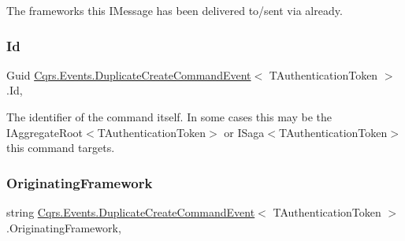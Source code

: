 The frameworks this I\+Message has been delivered to/sent via already. 

\mbox{\label{classCqrs_1_1Events_1_1DuplicateCreateCommandEvent_a6b837c04369ac127fc34f84799c3d70a_a6b837c04369ac127fc34f84799c3d70a}} 
\subsubsection{\texorpdfstring{Id}{Id}}
{\footnotesize\ttfamily Guid \hyperlink{classCqrs_1_1Events_1_1DuplicateCreateCommandEvent}{Cqrs.\+Events.\+Duplicate\+Create\+Command\+Event}$<$ T\+Authentication\+Token $>$.Id\hspace{0.3cm}{\ttfamily [get]}, {\ttfamily [set]}}



The identifier of the command itself. In some cases this may be the I\+Aggregate\+Root$<$\+T\+Authentication\+Token$>$ or I\+Saga$<$\+T\+Authentication\+Token$>$ this command targets. 

\mbox{\label{classCqrs_1_1Events_1_1DuplicateCreateCommandEvent_a9f3b0ffe268a9be9895009b3f8894727_a9f3b0ffe268a9be9895009b3f8894727}} 
\subsubsection{\texorpdfstring{Originating\+Framework}{OriginatingFramework}}
{\footnotesize\ttfamily string \hyperlink{classCqrs_1_1Events_1_1DuplicateCreateCommandEvent}{Cqrs.\+Events.\+Duplicate\+Create\+Command\+Event}$<$ T\+Authentication\+Token $>$.Originating\+Framework\hspace{0.3cm}{\ttfamily [get]}, {\ttfamily [set]}}



